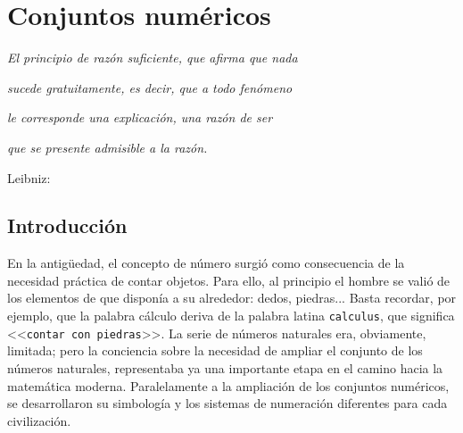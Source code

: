 
\chapter{Conjuntos numéricos}

\PartialToc

\hypersetup{linkcolor=ptctitle}

\vspace*{0.5cm}
 
\begin{flushright}
\textit{\footnotesize{}El principio de razón suficiente, que afirma
que nada}
\par\end{flushright}{\footnotesize \par}

\begin{flushright}
\textit{\footnotesize{}sucede gratuitamente, es decir, que a todo
fenómeno }
\par\end{flushright}{\footnotesize \par}

\begin{flushright}
\textit{\footnotesize{}le corresponde una explicación, una razón de
ser }
\par\end{flushright}{\footnotesize \par}

\begin{flushright}
\textit{\footnotesize{}que se presente admisible a la razón. }
\par\end{flushright}{\footnotesize \par}

\begin{flushright}
{\small{} }Leibniz: 
\par\end{flushright}

\vspace*{-1mm}


\section{Introducción }

En la antigüedad, el concepto de número surgió como consecuencia de
la necesidad práctica de contar objetos. Para ello, al principio el
hombre se valió de los elementos de que disponía a su alrededor: dedos,
piedras... Basta recordar, por ejemplo, que la palabra cálculo deriva
de la palabra latina \texttt{calculus}, que significa <<\texttt{contar
con piedras}>>. La serie de números naturales era, obviamente, limitada;
pero la conciencia sobre la necesidad de ampliar el conjunto de los
números naturales, representaba ya una importante etapa en el camino
hacia la matemática moderna. Paralelamente a la ampliación de los
conjuntos numéricos, se desarrollaron su simbología y los sistemas
de numeración diferentes para cada civilización.

